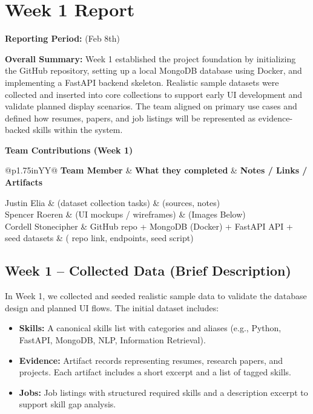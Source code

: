 \documentclass[11pt]{article}
\makeatletter
\newcommand{\WeekReport}[4]{
  \clearpage
  \section*{Week #1 Report}
  \addcontentsline{toc}{section}{Week #1 Report}
  \vspace{-0.25em}
  \noindent\textbf{Reporting Period:} #2

  \vspace{0.5em}
  \noindent\textbf{Overall Summary:} #3

  \vspace{0.75em}
  \noindent\textbf{Team Contributions (Week #1)}
  \vspace{0.25em}

  \begin{table}[H]
    \renewcommand{\arraystretch}{1.2}
    \begin{tabularx}{\linewidth}{@{}p{1.75in}YY@{}}
      \toprule
      \textbf{Team Member} & \textbf{What they completed} & \textbf{Notes / Links / Artifacts} \\
      \midrule
      #4
      \bottomrule
    \end{tabularx}
  \end{table}
}
\makeatother
\begin{document}
\WeekReport{1}{(Feb 8th)}{
Week 1 established the project foundation by initializing the GitHub repository, setting up a local MongoDB database using Docker, and implementing a FastAPI backend skeleton. Realistic sample datasets were collected and inserted into core collections to support early UI development and validate planned display scenarios. The team aligned on primary use cases and defined how resumes, papers, and job listings will be represented as evidence-backed skills within the system.
}{
Justin Elia & (dataset collection tasks) & (sources, notes) \\
Spencer Roeren & (UI mockups / wireframes) & (Images Below) \\
Cordell Stonecipher & GitHub repo + MongoDB (Docker) + FastAPI API + seed datasets & ( repo link, endpoints, seed script) \\
}


\subsection*{Week 1 -- Collected Data (Brief Description)}
\noindent
In Week 1, we collected and seeded realistic sample data to validate the database design and planned UI flows. The initial dataset includes:
\begin{itemize}
  \item \textbf{Skills:} A canonical skills list with categories and aliases (e.g., Python, FastAPI, MongoDB, NLP, Information Retrieval).
  \item \textbf{Evidence:} Artifact records representing resumes, research papers, and projects. Each artifact includes a short excerpt and a list of tagged skills.
  \item \textbf{Jobs:} Job listings with structured required skills and a description excerpt to support skill gap analysis.
\end{itemize}
\end{document}
